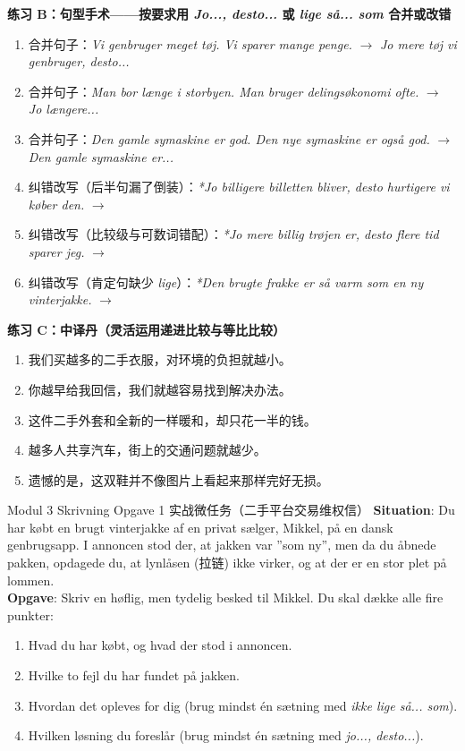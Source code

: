 \textbf{练习 B：句型手术——按要求用 \textit{Jo..., desto...} 或 \textit{lige så... som} 合并或改错}
\begin{enumerate}
  \item 合并句子：\textit{Vi genbruger meget tøj. Vi sparer mange penge.} $\rightarrow$ \textit{Jo mere tøj vi genbruger, desto...}
  \item 合并句子：\textit{Man bor længe i storbyen. Man bruger delingsøkonomi ofte.} $\rightarrow$ \textit{Jo længere...}
  \item 合并句子：\textit{Den gamle symaskine er god. Den nye symaskine er også god.} $\rightarrow$ \textit{Den gamle symaskine er...}
  \item 纠错改写（后半句漏了倒装）：\textit{*Jo billigere billetten bliver, desto hurtigere vi køber den.} $\rightarrow$
  \item 纠错改写（比较级与可数词错配）：\textit{*Jo mere billig trøjen er, desto flere tid sparer jeg.} $\rightarrow$
  \item 纠错改写（肯定句缺少 \textit{lige}）：\textit{*Den brugte frakke er så varm som en ny vinterjakke.} $\rightarrow$
\end{enumerate}

\textbf{练习 C：中译丹（灵活运用递进比较与等比比较）}
\begin{enumerate}
  \item 我们买越多的二手衣服，对环境的负担就越小。
  \item 你越早给我回信，我们就越容易找到解决办法。
  \item 这件二手外套和全新的一样暖和，却只花一半的钱。
  \item 越多人共享汽车，街上的交通问题就越少。
  \item 遗憾的是，这双鞋并不像图片上看起来那样完好无损。
\end{enumerate}


\begin{emailbox}{Modul 3 Skrivning Opgave 1 实战微任务（二手平台交易维权信）}
\textbf{Situation}: Du har købt en brugt vinterjakke af en privat sælger, Mikkel, på en dansk genbrugsapp. I annoncen stod der, at jakken var ”som ny”, men da du åbnede pakken, opdagede du, at lynlåsen (拉链) ikke virker, og at der er en stor plet på lommen.\\
\textbf{Opgave}: Skriv en høflig, men tydelig besked til Mikkel. Du skal dække alle fire punkter:
\begin{enumerate}
  \item Hvad du har købt, og hvad der stod i annoncen.
  \item Hvilke to fejl du har fundet på jakken.
  \item Hvordan det opleves for dig (brug mindst én sætning med \textit{ikke lige så... som}).
  \item Hvilken løsning du foreslår (brug mindst én sætning med \textit{jo..., desto...}).
\end{enumerate}
\end{emailbox}

